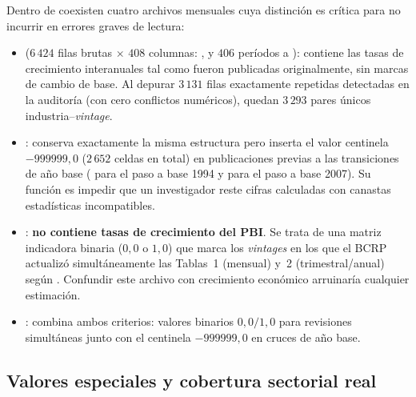 \documentclass[12pt,letterpaper]{article}
\begin{document}
Dentro de  coexisten cuatro archivos mensuales cuya distinción es crítica para no incurrir en errores graves de lectura:
\begin{itemize}
  \item {} (\(6\,424\) filas brutas \(\times\) \(408\) columnas: ,  y \(406\) períodos  a ): contiene las tasas de crecimiento interanuales tal como fueron publicadas originalmente, sin marcas de cambio de base. Al depurar \(3\,131\) filas exactamente repetidas detectadas en la auditoría (con cero conflictos numéricos), quedan \(3\,293\) pares únicos industria--\emph{vintage}.
  \item {}: conserva exactamente la misma estructura pero inserta el valor centinela \textbf{\(-999999{,}0\)} (\(2\,652\) celdas en total) en publicaciones previas a las transiciones de año base ( para el paso a base 1994 y  para el paso a base 2007). Su función es impedir que un investigador reste cifras calculadas con canastas estadísticas incompatibles.
  \item {}: \textbf{no contiene tasas de crecimiento del PBI}. Se trata de una matriz indicadora binaria (\(0{,}0\) o \(1{,}0\)) que marca los \emph{vintages} en los que el BCRP actualizó simultáneamente las Tablas~1 (mensual) y~2 (trimestral/anual) según . Confundir este archivo con crecimiento económico arruinaría cualquier estimación.
  \item {}: combina ambos criterios: valores binarios \(0{,}0/1{,}0\) para revisiones simultáneas junto con el centinela \(-999999{,}0\) en cruces de año base.
\end{itemize}

\subsection{Valores especiales y cobertura sectorial real}
\end{document}
